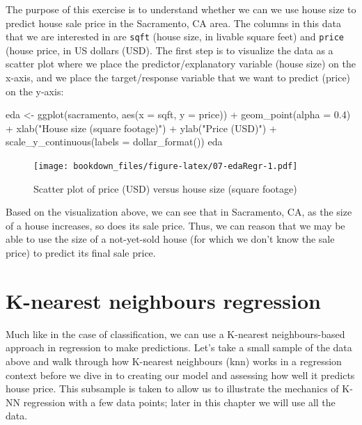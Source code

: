 \documentclass[
]{krantz}
\makeatletter
\newenvironment{Shaded}{\begin{snugshade}}{\end{snugshade}}
\newcommand{\AttributeTok}[1]{\textcolor[rgb]{0.61,0.61,0.61}{#1}}
\newcommand{\FloatTok}[1]{\textcolor[rgb]{0.06,0.06,0.06}{#1}}
\newcommand{\FunctionTok}[1]{\textcolor[rgb]{0,0,0}{#1}}
\newcommand{\NormalTok}[1]{#1}
\newcommand{\OtherTok}[1]{\textcolor[rgb]{0.37,0.37,0.37}{#1}}
\newcommand{\SpecialCharTok}[1]{\textcolor[rgb]{0,0,0}{#1}}
\newcommand{\StringTok}[1]{\textcolor[rgb]{0.5,0.5,0.5}{#1}}
\newenvironment{kframe}{%
\medskip{}
\setlength{\fboxsep}{.8em}
 \def\at@end@of@kframe{}%
 \ifinner\ifhmode%
  \def\at@end@of@kframe{\end{minipage}}%
  \begin{minipage}{\columnwidth}%
 \fi\fi%
 \def\FrameCommand##1{\hskip\@totalleftmargin \hskip-\fboxsep
 \colorbox{shadecolor}{##1}\hskip-\fboxsep
     \hskip-\linewidth \hskip-\@totalleftmargin \hskip\columnwidth}%
 \MakeFramed {\advance\hsize-\width
   \@totalleftmargin\z@ \linewidth\hsize
   \@setminipage}}%
 {\par\unskip\endMakeFramed%
 \at@end@of@kframe}
\renewenvironment{Shaded}{\begin{kframe}}{\end{kframe}}
\makeatother
\begin{document}
The purpose of this exercise is to understand whether we can we use house size
to predict house sale price in the Sacramento, CA area. The columns in this
data that we are interested in are \texttt{sqft} (house size, in livable square feet)
and \texttt{price} (house price, in US dollars (USD). The first step is to visualize
the data as a scatter plot where we place the predictor/explanatory variable
(house size) on the x-axis, and we place the target/response variable that we
want to predict (price) on the y-axis:

\begin{Shaded}
\begin{Highlighting}[]
\NormalTok{eda }\OtherTok{\textless{}{-}} \FunctionTok{ggplot}\NormalTok{(sacramento, }\FunctionTok{aes}\NormalTok{(}\AttributeTok{x =}\NormalTok{ sqft, }\AttributeTok{y =}\NormalTok{ price)) }\SpecialCharTok{+}
  \FunctionTok{geom\_point}\NormalTok{(}\AttributeTok{alpha =} \FloatTok{0.4}\NormalTok{) }\SpecialCharTok{+}
  \FunctionTok{xlab}\NormalTok{(}\StringTok{"House size (square footage)"}\NormalTok{) }\SpecialCharTok{+}
  \FunctionTok{ylab}\NormalTok{(}\StringTok{"Price (USD)"}\NormalTok{) }\SpecialCharTok{+}
  \FunctionTok{scale\_y\_continuous}\NormalTok{(}\AttributeTok{labels =} \FunctionTok{dollar\_format}\NormalTok{())}
\NormalTok{eda}
\end{Highlighting}
\end{Shaded}

\begin{figure}
\centering
\texttt{[image: bookdown\_files/figure-latex/07-edaRegr-1.pdf]}
\caption{\label{fig:07-edaRegr}Scatter plot of price (USD) versus house size (square footage)}
\end{figure}

Based on the visualization above, we can see that in Sacramento, CA, as the
size of a house increases, so does its sale price. Thus, we can reason that we
may be able to use the size of a not-yet-sold house (for which we don't know
the sale price) to predict its final sale price.

\hypertarget{k-nearest-neighbours-regression}{%
\section{K-nearest neighbours regression}\label{k-nearest-neighbours-regression}}

Much like in the case of classification, we can use a K-nearest
neighbours-based approach in regression to make predictions. Let's take a small
sample of the data above and walk through how K-nearest neighbours (knn) works
in a regression context before we dive in to creating our model and assessing
how well it predicts house price. This subsample is taken to allow us to
illustrate the mechanics of K-NN regression with a few data points; later in
this chapter we will use all the data.
\end{document}

